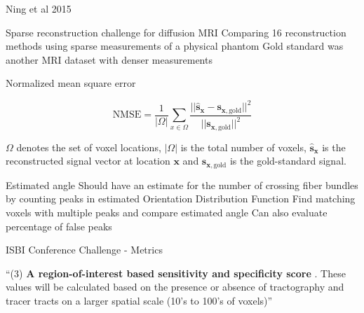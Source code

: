 \documentclass[presentation, 10pt]{beamer}
\begin{document}
\begin{frame}{Ning et al 2015}
  \begin{outline}
    \1 Sparse reconstruction challenge for diffusion MRI
    \2 Comparing 16 reconstruction methods using sparse measurements of a physical phantom
    \2 Gold standard was another MRI dataset with denser measurements

    \1 Normalized mean square error

  
    \begin{equation}
      \text{NMSE} = \frac{1}{|\Omega|} \sum_{x \in \Omega} \frac{||\hat{\bm{s}}_{\bm{x}} - \bm{s}_{\bm{x},\text{gold}}||^2}{||\bm{s}_{\bm{x},\text{gold}}||^2}
    \end{equation}

    \2 $\Omega$ denotes the set of voxel locations, $|\Omega|$ is the total number of voxels, $\hat{\bm{s}}_{\bm{x}}$ is the reconstructed signal vector at location $\bm{x}$ and $\bm{s}_{\bm{x},\text{gold}}$ is the gold-standard signal.\newline

    \1 Estimated angle
    \2 Should have an estimate for the number of crossing fiber bundles by counting peaks in estimated Orientation Distribution Function
    \2 Find matching voxels with multiple peaks and compare estimated angle
    \2 Can also evaluate percentage of false peaks

  \end{outline}

\end{frame}



\begin{frame}{ISBI Conference Challenge - Metrics}

  \begin{outline}
    \1 ``(3) \textbf{A region-of-interest based sensitivity and specificity score} \cite{thomas}. These values will be calculated based on the presence or absence of tractography and tracer tracts on a larger spatial scale (10’s to 100’s of voxels)''
  \end{outline}
  
\end{frame}
\end{document}
